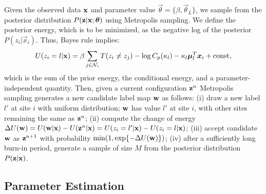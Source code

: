 \documentclass[runningheads, a4paper]{llncs}
\begin{document}
Given the observed data $\text{\bf x}$ and parameter value $\vec \theta =
\{\beta, \vec \theta_L \}$, we sample from the posterior
distribution $P(\mat z | \mat x; \vec \theta)$ using Metropolis
sampling. We define the posterior energy, which is to be minimized, as the
negative log of the posterior $P(z_i | \vec x_i)$. Thus,
Bayes rule implies:
\begin{equation}
  U( z_i = l| \mat x)
  =
   \beta \sum_{j \in \cN_i} T(z_i \neq z_j)
    -
    \log C_p(\kappa_l)
    -
    \kappa_l \vec \mu_l^T \vec x_i
  + \mathrm{const},
  \label{eq:sample}
\end{equation}
which is the sum of the prior energy, the conditional energy, and a
parameter-independent quantity. Then, given a current configuration
$\text{\bf z}^n$ Metropolis sampling generates a new candidate label map $\text{\bf w}$ as
follows: (i) draw a new label $l'$ at site $i$ with uniform
distribution; $\text{\bf w}$ has value $l'$ at site $i$, with other sites
remaining the same as $\text{\bf z}^n$; (ii) compute the change of energy
$\Delta U(\text{\bf w}) = U(\text{\bf w} | \text{\bf x}) - U( \text{\bf z}^n | \text{\bf x}) = U(z_i
= l'| \text{\bf x}) - U(z_i = l | \text{\bf x})$; (iii) accept candidate $\text{\bf w}$
as $\text{\bf z}^{n+1}$ with probability $\min (1, \exp \{ -\Delta U(\text{\bf w})
\})$; (iv) after a sufficiently long burn-in period, generate a sample of size $M$
from the posterior distribution $P(\text{\bf z}| \text{\bf x})$.


\subsection{Parameter Estimation}
\end{document}
